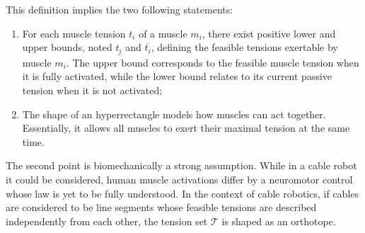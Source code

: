 This definition implies the two following statements:
\begin{enumerate}
    \item {For each muscle tension $t_i$ of a muscle $m_i$, there exist positive lower and upper bounds, noted $\underline{t_i}$ and $\overline{t_i}$, defining the feasible tensions exertable by muscle $m_i$. The upper bound corresponds to the feasible muscle tension when it is fully activated, while the lower bound relates to its current passive tension when it is not activated;}
    \item {The shape of an hyperrectangle models how muscles can act together. Essentially, it allows all muscles to exert their maximal tension at the same time.}
\end{enumerate}

The second point is biomechanically a strong assumption. While in a cable robot it could be considered, human muscle activations differ by a neuromotor control whose law is yet to be fully understood. In the context of cable robotics, if cables are considered to be line segments whose feasible tensions are described independently from each other, the tension set $\mathcal{T}$ is shaped as an orthotope. 


